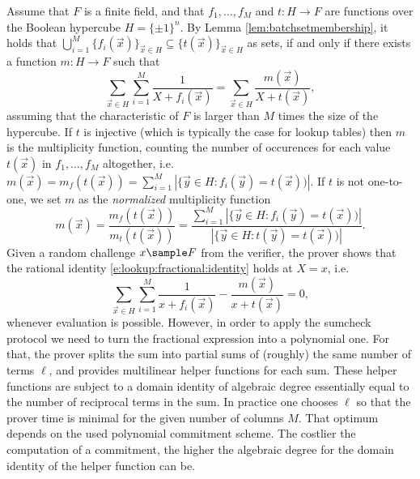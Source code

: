 \documentclass[11pt]{article}
\theoremstyle{definition}
\theoremstyle{definition}
\begin{document}
Assume that $F$ is a finite field, and that $f_1, \ldots, f_M$ and  $t: H\rightarrow F$ are functions over the Boolean hypercube $H=\{\pm 1\}^n$. 
By Lemma \ref{lem:batchsetmembership}, it holds that $\bigcup_{i=1}^M \{f_i(\vec x)\}_{\vec x\in H}\subseteq \{t(\vec x)\}_{\vec x\in H}$ as sets, if and only if there exists a function $m: H\rightarrow F$ such that
\begin{equation}
\label{e:lookup:fractional:identity}
\sum_{\vec x\in H} \sum_{i=1}^M \frac{1}{X + f_i(\vec x)} = \sum_{\vec x\in H} \frac{m(\vec x)}{X + t(\vec x)},
\end{equation}
assuming that the characteristic of $F$ is larger than $M$ times the size of the hypercube.
If $t$ is injective (which is typically the case for lookup tables) then $m$ is the multiplicity function, counting the number of occurences for each value $t(\vec x)$ in $f_1,\ldots, f_M$ altogether, i.e.
$m(\vec x) = m_f(t(\vec x)) = \sum_{i=1}^M|\{\vec y \in H: f_i(\vec y) = t(\vec x))|$.
If $t$ is not one-to-one, we set $m$ as the \textit{normalized} multiplicity function 
\begin{equation}
\label{e:lookup:m}
m(\vec x) = 
\frac{m_f(t(\vec x))}{m_t(t(\vec x))} = \frac{ \sum_{i=1}^M |\{\vec y \in H: f_i(\vec y) = t(\vec x))|}{ |\{\vec y \in H: t(\vec y) = t(\vec x))|}.
\end{equation}
Given a random challenge $x\sample F$ from the verifier, the prover shows that the rational identity \eqref{e:lookup:fractional:identity} holds at $X= x$, i.e.
\begin{equation}
\label{e:lookup:fractional:sumcheck}
\sum_{\vec x\in H} \sum_{i=1}^M \frac{1}{x + f_i(\vec x)} -  \frac{m(\vec x)}{x + t(\vec x)} = 0,
\end{equation}
whenever evaluation is possible. 
However, in order to apply the sumcheck protocol we need to turn the fractional expression into a polynomial one.
For that, the prover splits the sum into partial sums of (roughly) the same number of terms $\ell$, and provides multilinear helper functions for each sum.
These helper functions are subject to a domain identity of algebraic degree essentially equal to  the number of reciprocal terms in the sum.
In practice one chooses $\ell$ so that the prover time is minimal for the given number of columns $M$.
That optimum depends on the used polynomial commitment scheme. 
The costlier the computation of a commitment, the higher the algebraic degree for the domain identity of the helper function can be. 
\end{document}

